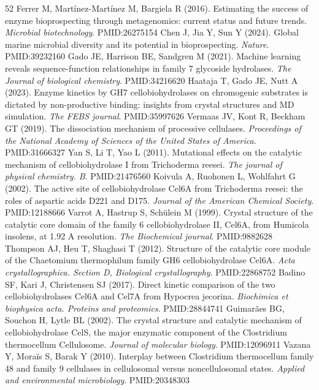 \documentclass[11pt]{article}
\begin{document}
\begin{thebibliography}{52}
 Ferrer M, Mart\'inez-Mart\'inez M, Bargiela R (2016). Estimating the success of enzyme bioprospecting through metagenomics: current status and future trends. \textit{Microbial biotechnology}. PMID:26275154
 Chen J, Jia Y, Sun Y (2024). Global marine microbial diversity and its potential in bioprospecting. \textit{Nature}. PMID:39232160
 Gado JE, Harrison BE, Sandgren M (2021). Machine learning reveals sequence-function relationships in family 7 glycoside hydrolases. \textit{The Journal of biological chemistry}. PMID:34216620
 Haataja T, Gado JE, Nutt A (2023). Enzyme kinetics by GH7 cellobiohydrolases on chromogenic substrates is dictated by non-productive binding: insights from crystal structures and MD simulation. \textit{The FEBS journal}. PMID:35997626
 Vermaas JV, Kont R, Beckham GT (2019). The dissociation mechanism of processive cellulases. \textit{Proceedings of the National Academy of Sciences of the United States of America}. PMID:31666327
 Yan S, Li T, Yao L (2011). Mutational effects on the catalytic mechanism of cellobiohydrolase I from Trichoderma reesei. \textit{The journal of physical chemistry. B}. PMID:21476560
 Koivula A, Ruohonen L, Wohlfahrt G (2002). The active site of cellobiohydrolase Cel6A from Trichoderma reesei: the roles of aspartic acids D221 and D175. \textit{Journal of the American Chemical Society}. PMID:12188666
 Varrot A, Hastrup S, Sch\"ulein M (1999). Crystal structure of the catalytic core domain of the family 6 cellobiohydrolase II, Cel6A, from Humicola insolens, at 1.92 A resolution. \textit{The Biochemical journal}. PMID:9882628
 Thompson AJ, Heu T, Shaghasi T (2012). Structure of the catalytic core module of the Chaetomium thermophilum family GH6 cellobiohydrolase Cel6A. \textit{Acta crystallographica. Section D, Biological crystallography}. PMID:22868752
 Badino SF, Kari J, Christensen SJ (2017). Direct kinetic comparison of the two cellobiohydrolases Cel6A and Cel7A from Hypocrea jecorina. \textit{Biochimica et biophysica acta. Proteins and proteomics}. PMID:28844741
 Guimar\~aes BG, Souchon H, Lytle BL (2002). The crystal structure and catalytic mechanism of cellobiohydrolase CelS, the major enzymatic component of the Clostridium thermocellum Cellulosome. \textit{Journal of molecular biology}. PMID:12096911
 Vazana Y, Mora\"is S, Barak Y (2010). Interplay between Clostridium thermocellum family 48 and family 9 cellulases in cellulosomal versus noncellulosomal states. \textit{Applied and environmental microbiology}. PMID:20348303

\end{thebibliography}
\end{document}
